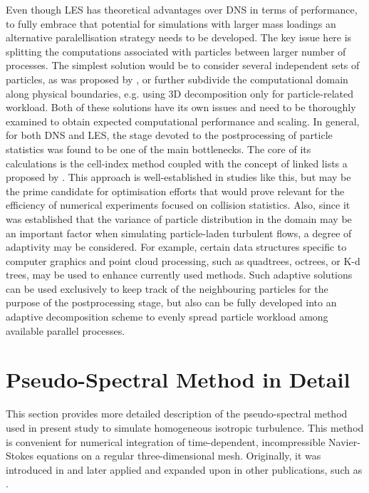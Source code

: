 \documentclass{pracamgren}
\begin{document}
Even though LES has theoretical advantages over DNS in terms of performance, to fully embrace that potential for simulations with larger mass loadings an alternative paralellisation strategy needs to be developed.
The key issue here is splitting the computations associated with particles between larger number of processes.
The simplest solution would be to consider several independent sets of particles, as was proposed by \textcite{Ayala2014}, or further subdivide the computational domain along physical boundaries, e.g. using 3D decomposition only for particle-related workload.
Both of these solutions have its own issues and need to be thoroughly examined to obtain expected computational performance and scaling.
In general, for both DNS and LES, the stage devoted to the postprocessing of particle statistics was found to be one of the main bottlenecks.
The core of its calculations is the cell-index method coupled with the concept of linked lists a proposed by \textcite{Allen1987}.
This approach is well-established in studies like this, but may be the prime candidate for optimisation efforts that would prove relevant for the efficiency of numerical experiments focused on collision statistics.
Also, since it was established that the variance of particle distribution in the domain may be an important factor when simulating particle-laden turbulent flows, a degree of adaptivity may be considered.
For example, certain data structures specific to computer graphics and point cloud processing, such as quadtrees, octrees, or K-d trees, may be used to enhance currently used methods.
Such adaptive solutions can be used exclusively to keep track of the neighbouring particles for the purpose of the postprocessing stage, but also can be fully developed into an adaptive decomposition scheme to evenly spread particle workload among available parallel processes. 




\appendix
\chapter{Pseudo-Spectral Method in Detail}
\label{app:psm}

This section provides more detailed description of the pseudo-spectral method used in present study to simulate homogeneous isotropic turbulence. 
This method is convenient for numerical integration of time-dependent, incompressible Navier-Stokes equations on a regular three-dimensional mesh.
Originally, it was introduced in \textcite{Orszag1972} and later applied and expanded upon in other publications, such as \textcite{Rogallo1981,Eswaran1988,Pope2000,Peng2009}.
\end{document}
